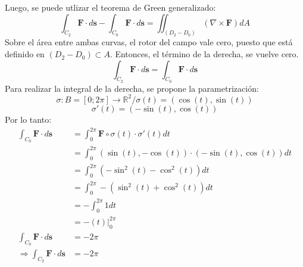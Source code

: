 \begin{solution}
\begin{center}
\begin{tikzpicture}
        \end{tikzpicture}
    \end{center}
    Luego, se puede utlizar el teorema de Green generalizado:
    \begin{equation*}
        \int_{C_2}\boldsymbol{F}\cdot d\boldsymbol{s} - \int_{C_0}\boldsymbol{F}\cdot d\boldsymbol{s} = \iint_{\left(D_2-D_0\right)}\left(\nabla \times \boldsymbol{F}\right)dA
    \end{equation*}
    Sobre el área entre ambas curvas, el rotor del campo vale cero, puesto que está definido en $\left(D_2-D_0\right)\subset A$. Entonces, el término de la derecha, se vuelve cero.
    \begin{equation*}
        \int_{C_2}\boldsymbol{F}\cdot d\boldsymbol{s} = \int_{C_0}\boldsymbol{F}\cdot d\boldsymbol{s}
    \end{equation*}
    Para realizar la integral de la derecha, se propone la parametrización:
    \begin{equation*}
        \sigma: B=[0;2\pi] \longrightarrow \mathbb{R}^2 / \sigma(t) = (\cos(t),\sin(t))
    \end{equation*}
    \begin{equation*}
        \sigma'(t)=(-\sin(t),\cos(t))
    \end{equation*}
    Por lo tanto:
    \begin{align*}
        \int_{C_0}\boldsymbol{F}\cdot d\boldsymbol{s}&=\int_{0}^{2\pi}\boldsymbol{F}\circ\sigma(t) \cdot \sigma'(t) dt\\
        &=\int_{0}^{2\pi} (\sin(t),-\cos(t)) \cdot (-\sin(t),\cos(t)) dt\\
        &=\int_{0}^{2\pi} \left(-\sin^2(t)-\cos^2(t)\right) dt\\
        &=\int_{0}^{2\pi} -\left(\sin^2(t)+\cos^2(t)\right) dt\\
        &=-\int_{0}^{2\pi} 1 dt\\
        &=-\left.\left(t\right)\right|_{0}^{2\pi}\\
        \int_{C_0}\boldsymbol{F}\cdot d\boldsymbol{s}&=-2\pi\\
        \Rightarrow \int_{C_2}\boldsymbol{F}\cdot d\boldsymbol{s}&=-2\pi
    \end{align*}
\end{solution}


